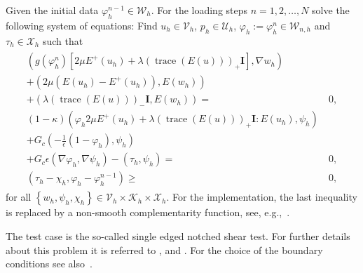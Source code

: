 Given the initial data $\varphi_h^{n-1} \in \mathcal{W}_h$.
For the loading steps $n=1,2,\ldots, N$ solve the following system of equations:
Find $u_h \in \mathcal{V}_h$, $p_h \in \mathcal{U}_h$, $\varphi_h:= \varphi_h^n \in \mathcal{W}_{n,h}$ and $\tau_h \in \mathcal{X}_h$ such that 
 \begin{align*}
 \begin{aligned}
   \left(g(\varphi_h^{n})\left[2\mu E^+(u_h) + \lambda (\operatorname{trace}(E(u)))_+ \textbf{I}\right],\nabla w_h \right)\\
  + \left(2\mu \left(E(u_h)-E^+(u_h)\right),E(w_h)\right)\\
 + \left(\lambda (\operatorname{trace}(E(u)))_- \textbf{I},E(w_h)\right) =&\ 0,\\
  (1- \kappa)\left(\varphi_h 2\mu E^+(u_h) + \lambda (\operatorname{trace}(E(u)))_+ \textbf{I} : E(u_h),\psi_h\right)\\
  + G_c \left(-\frac{1}{\epsilon} (1-\varphi_h),\psi_h\right)\\ 
  + G_c \epsilon \left(\nabla \varphi_h,\nabla\psi_h \right) - \left(\tau_h,\psi_h\right) =&\ 0,\\
\left(\tau_h - \chi_h,\varphi_h -\varphi_h^{n-1}\right)\geq&\ 0,
\end{aligned}
\end{align*}
for all $\left\{w_h,\psi_h,\chi_h\right\} \in \mathcal{V}_h \times
\mathcal{K}_h \times \mathcal{X}_h$.
For the implementation, the last inequality is replaced by a
non-smooth complementarity function, see, e.g.,~\cite[Section~4.1]{MangWallothWickWollner:2019}.

The test case is the so-called single edged notched 
shear test. For further details about this problem it is referred
to \cite{MieHofWel2010,BoVeScoHuLa12}, and \cite{WeWiWo2014}.
For the choice of the boundary conditions see also~\cite[Section~5]{MangWallothWickWollner:2019}.





